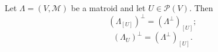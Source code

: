 Let $\Lambda = (V, \mathcal{M})$ be a matroid and let $U \in \mathcal{P}(V)$. Then
$$(\Lambda_{[U]})^\perp = (\Lambda^\perp)_{[U]};$$
$$(\Lambda_U)^\perp = (\Lambda^\perp)_{[U]}.$$

